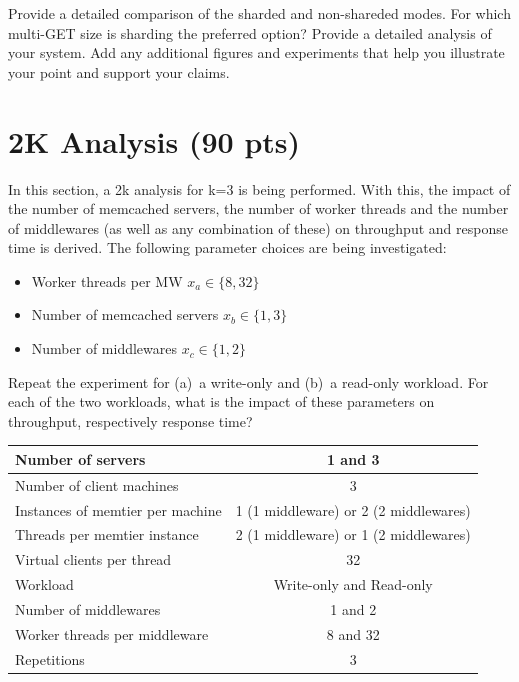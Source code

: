 \documentclass[11pt,a4paper]{article}
\begin{document}
Provide a detailed comparison of the sharded and non-shareded modes. For which multi-GET size is sharding the preferred option? Provide a detailed analysis of your system. Add any additional figures and experiments that help you illustrate your point and support your claims.

\section{2K Analysis (90 pts)}

In this section, a 2k analysis for k=3 is being performed. With this, the impact of the number of memcached servers, the number of worker threads and the number of middlewares (as well as any combination of these) on throughput and response time is derived. The following parameter choices are being investigated:

\begin{itemize}
		
	\item Worker threads per MW $x_a \in \{8, 32\}$
	\item Number of memcached servers $x_b \in \{1, 3\}$
	\item Number of middlewares $x_c \in \{1,2\}$
	      	      
\end{itemize}

Repeat the experiment for (a)~a write-only and (b)~a read-only workload.
For each of the two workloads, what is the impact of these parameters on throughput, respectively response time?

\begin{center}
	\scriptsize{
		\begin{tabular}{|l|c|}
			\hline Number of servers                & 1 and 3                                     \\ 
			\hline Number of client machines        & 3                                           \\ 
			\hline Instances of memtier per machine & 1 (1 middleware) or 2 (2 middlewares)       \\ 
			\hline Threads per memtier instance     & 2 (1 middleware) or 1 (2 middlewares)       \\
			\hline Virtual clients per thread       & 32                                          \\ 
			\hline Workload                         & Write-only and Read-only                    \\
			\hline Number of middlewares            & 1 and 2                                     \\
			\hline Worker threads per middleware    & 8 and 32                                    \\
			\hline Repetitions                      & 3                                   \\ 
			\hline 
		\end{tabular}
	} 
\end{center}
\end{document}
